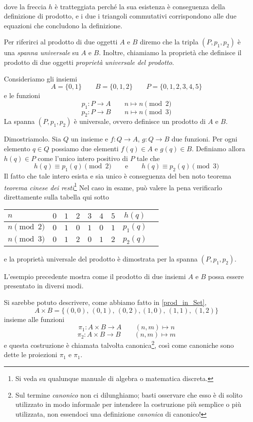 %
\\[2ex]
dove la freccia \(h\) è tratteggiata perché la sua esistenza è conseguenza della definizione di prodotto, e i due i triangoli commutativi corrispondono alle due equazioni che concludono la definizione.

\medskip
Per riferirci al prodotto di due oggetti \(A\) e \(B\) diremo che la tripla \((P,p_1,p_2)\) è una \emph{spanna universale} su  \(A\) e \(B\). Inoltre, chiamiamo la proprietà che definisce il prodotto di due oggetti \emph{proprietà universale del prodotto}.

\begin{example}\label{esempio_spanna_universale_in_Set}
	Consideriamo gli insiemi
	\[
		A=\{0,1\}\qquad B=\{0,1,2\}\qquad P=\{0,1,2,3,4,5\}
	\]
	e le funzioni
	\[
		p_1\colon P\to A\qquad n\mapsto n\pmod 2
	\]
	\[
		p_2\colon P\to B\qquad n\mapsto n\pmod 3
	\]
	La spanna \((P, p_1, p_2)\) è universale, ovvero definisce un prodotto di \(A\) e \(B\).


	Dimostriamolo. Sia \(Q\) un insieme e \(f\colon Q\to A\), \(g\colon Q\to B\) due funzioni. Per ogni elemento \(q\in Q\) possiamo due elementi \(f(q)\in A\) e \(g(q)\in B\). Definiamo allora \(h(q)\in P\) come l'unico intero positivo di \(P\) tale che
	\[
		h(q)\equiv p_1(q) \pmod 2\qquad\text{e}\qquad h(q)\equiv p_2(q) \pmod 3
	\]
	Il fatto che tale intero esista e sia unico è conseguenza del ben noto teorema \emph{teorema cinese dei resti}\footnote{Si veda su qualunque manuale di algebra o matematica discreta.} Nel caso in esame, può valere la pena verificarlo direttamente sulla tabella qui sotto
	\begin{center}
		\begin{tabular}{|l|c|c|c|c|c|c|c|c|}
			\hline
			\(n\)         & \(0\) & \(1\) & \(2\) & \(3\) & \(4\) & \(5\) & \(h(q)\)   \\
			\hline
			\(n \pmod 2\) & \(0\) & \(1\) & \(0\) & \(1\) & \(0\) & \(1\) & \(p_1(q)\) \\
			\hline
			\(n \pmod 3\) & \(0\) & \(1\) & \(2\) & \(0\) & \(1\) & \(2\) & \(p_2(q)\) \\
			\hline
		\end{tabular}
	\end{center}
	e la proprietà universale del prodotto è dimostrata per la spanna \((P, p_1, p_2)\).
\end{example}
L'esempio precedente mostra come il prodotto di due insiemi \(A\) e \(B\) possa essere presentato in diversi modi.

Si sarebbe potuto descrivere, come abbiamo fatto  in \ref{prod_in_Set},
\[
	A\times B=\{(0,0),\,(0,1),\,(0,2),(1,0),\,(1,1),\,(1,2)\}
\]
insieme alle funzioni
\[
	\pi_1\colon A\times B\to A\qquad (n,m)\mapsto n
\]
\[
	\pi_2 \colon A\times B\to B\qquad (n,m)\mapsto m
\]
e questa costruzione è chiamata talvolta canonica\footnote{Sul termine \emph{canonico} non ci dilunghiamo; basti osservare che esso è di solito utilizzato in modo informale per intendere la costruzione più semplice o più utilizzata, non essendoci una definizione \emph{canonica} di canonico!}, così come canoniche sono dette le proiezioni \(\pi_1\) e \(\pi_1\).

